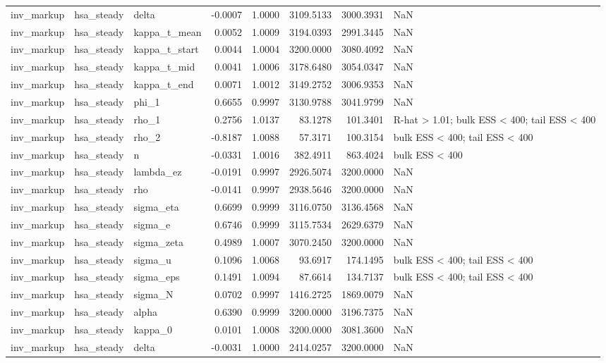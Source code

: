\begin{tabular}{lllrrrrl}
inv\_markup & hsa\_steady & delta & -0.0007 & 1.0000 & 3109.5133 & 3000.3931 & NaN \\
inv\_markup & hsa\_steady & kappa\_t\_mean & 0.0052 & 1.0009 & 3194.0393 & 2991.3445 & NaN \\
inv\_markup & hsa\_steady & kappa\_t\_start & 0.0044 & 1.0004 & 3200.0000 & 3080.4092 & NaN \\
inv\_markup & hsa\_steady & kappa\_t\_mid & 0.0041 & 1.0006 & 3178.6480 & 3054.0347 & NaN \\
inv\_markup & hsa\_steady & kappa\_t\_end & 0.0071 & 1.0012 & 3149.2752 & 3006.9353 & NaN \\
inv\_markup & hsa\_steady & phi\_1 & 0.6655 & 0.9997 & 3130.9788 & 3041.9799 & NaN \\
inv\_markup & hsa\_steady & rho\_1 & 0.2756 & 1.0137 & 83.1278 & 101.3401 & R-hat > 1.01; bulk ESS < 400; tail ESS < 400 \\
inv\_markup & hsa\_steady & rho\_2 & -0.8187 & 1.0088 & 57.3171 & 100.3154 & bulk ESS < 400; tail ESS < 400 \\
inv\_markup & hsa\_steady & n & -0.0331 & 1.0016 & 382.4911 & 863.4024 & bulk ESS < 400 \\
inv\_markup & hsa\_steady & lambda\_ez & -0.0191 & 0.9997 & 2926.5074 & 3200.0000 & NaN \\
inv\_markup & hsa\_steady & rho & -0.0141 & 0.9997 & 2938.5646 & 3200.0000 & NaN \\
inv\_markup & hsa\_steady & sigma\_eta & 0.6699 & 0.9999 & 3116.0750 & 3136.4568 & NaN \\
inv\_markup & hsa\_steady & sigma\_e & 0.6746 & 0.9999 & 3115.7534 & 2629.6379 & NaN \\
inv\_markup & hsa\_steady & sigma\_zeta & 0.4989 & 1.0007 & 3070.2450 & 3200.0000 & NaN \\
inv\_markup & hsa\_steady & sigma\_u & 0.1096 & 1.0068 & 93.6917 & 174.1495 & bulk ESS < 400; tail ESS < 400 \\
inv\_markup & hsa\_steady & sigma\_eps & 0.1491 & 1.0094 & 87.6614 & 134.7137 & bulk ESS < 400; tail ESS < 400 \\
inv\_markup & hsa\_steady & sigma\_N & 0.0702 & 0.9997 & 1416.2725 & 1869.0079 & NaN \\
inv\_markup & hsa\_steady & alpha & 0.6390 & 0.9999 & 3200.0000 & 3196.7375 & NaN \\
inv\_markup & hsa\_steady & kappa\_0 & 0.0101 & 1.0008 & 3200.0000 & 3081.3600 & NaN \\
inv\_markup & hsa\_steady & delta & -0.0031 & 1.0000 & 2414.0257 & 3200.0000 & NaN \\

\end{tabular}
